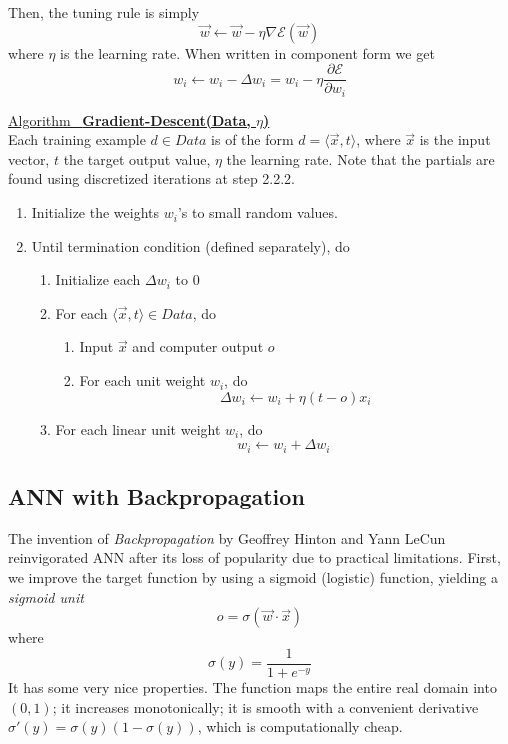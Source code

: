 \documentclass[12pt]{article}  %
\newcommand{\algtitle}[1]{\underline{Algorithm \ {\bf #1}} \vspace*{1mm}\\}
\begin{document}
Then, the tuning rule is simply $$\vec{w} \leftarrow \vec{w} - \eta \nabla \mathcal{E}(\vec{w})$$ where $\eta$ is the learning rate. When written in component form we get $$w_i \leftarrow w_i - \Delta w_i = w_i - \eta \frac{\partial \mathcal{E}}{\partial w_i}$$


\algtitle{Gradient-Descent(Data, $\eta$)}
Each training example $d \in Data$ is of the form $d = \langle \vec{x}, t \rangle$, where $\vec{x}$ is the input vector, $t$ the target output value, $\eta$ the learning rate. Note that the partials are found using discretized iterations at step 2.2.2.

\begin{enumerate}
	\item Initialize the weights $w_i$'s to small random values.
	\item Until termination condition (defined separately), do
		\begin{enumerate}
			\item Initialize each $\Delta w_i$ to 0
			\item For each $\langle \vec{x}, t \rangle \in Data$, do 
			\begin{enumerate}
				\item Input $\vec{x}$ and computer output $o$
				\item For each unit weight $w_i$, do $$\Delta w_i \leftarrow w_i + \eta(t-o)x_i$$
			\end{enumerate}
			\item For each linear unit weight $w_i$, do $$w_i \leftarrow w_i + \Delta w_i$$
		\end{enumerate}
\end{enumerate}





\subsection{ANN with Backpropagation}

The invention of {\em Backpropagation} by Geoffrey Hinton and Yann LeCun reinvigorated ANN after its loss of popularity due to practical limitations. First, we improve the target function by using a sigmoid (logistic) function, yielding a {\em sigmoid unit} $$o = \sigma (\vec{w} \cdot \vec{x})$$ where $$\sigma(y) = \frac{1}{1+e^{-y}}$$ It has some very nice properties. The function maps the entire real domain into $(0,1)$; it increases monotonically; it is smooth with a convenient derivative $\sigma'(y) = \sigma(y) (1 - \sigma(y))$, which is computationally cheap.
\end{document}
